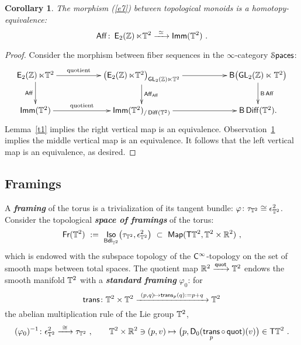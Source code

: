 \documentclass{amsart}
\newtheorem{cor}[theorem]{Corollary}
\theoremstyle{definition}
\theoremstyle{remark}
\DeclareMathOperator{\Iso}{\sf Iso}
\DeclareMathOperator{\Map}{{\sf Map}}
\newcommand{\bit}[1]{\textbf{\textit{#1}}}
\DeclareMathOperator{\Diff}{{\sf Diff}}
\DeclareMathOperator{\Spaces}{\cS\mathsf{paces}}
\newcommand{\xra}{\xrightarrow}
\def\sE{\mathsf E}\def\sF{\mathsf F}\def\sG{\mathsf G}\def\sH{\mathsf H}
\DeclareMathOperator{\GL}{\sf GL}
\DeclareMathOperator{\quot}{\sf quot}
\DeclareMathOperator{\Fr}{\sf Fr}
\DeclareMathOperator{\trans}{\sf trans}
\DeclareMathOperator{\Bdl}{\sf Bdl}
\DeclareMathOperator{\Imm}{\sf Imm}
\DeclareMathOperator{\Aff}{\sf Aff}
\DeclareMathOperator{\EZ}{\sE_2(\ZZ)}
\begin{document}
\begin{cor}
\label{t22}
The morphism (\ref{e7}) between topological monoids is a homotopy-equivalence:
\[
\Aff
\colon
\EZ \ltimes \TT^2
\xra{~\simeq~}
\Imm(\TT^2)
~.
\]

\end{cor}

\begin{proof}

Consider the morphism between fiber sequences in the $\infty$-category $\Spaces$:
\[
\xymatrix{
\EZ \ltimes \TT^2
\ar[rr]^-{\rm quotient}
\ar[d]_-{\Aff}
&&
\bigl(
\EZ \ltimes \TT^2
\bigr)_{\GL_2(\ZZ) \ltimes \TT^2}
\ar[rr]
\ar[d]^-{\Aff_{\Aff}}
&&
\sB\bigl( \GL_2(\ZZ) \ltimes \TT^2 \bigr)
\ar[d]^-{\sB \Aff}
\\
\Imm(\TT^2)
\ar[rr]^-{\rm quotient}
&&
\Imm(\TT^2)_{/\Diff(\TT^2)}
\ar[rr]
&&
\sB \Diff(\TT^2)
.
}
\]
Lemma~\ref{t1} implies the right vertical map is an equivalence.
Observation~\ref{t22} implies the middle vertical map is an equivalence.
It follows that the left vertical map is an equivalence, as desired.



\end{proof}



















\subsection{Framings}



A \bit{framing} of the torus is a trivialization of its tangent bundle: $\varphi\colon  \tau_{\mathbb T^2} \cong  \epsilon^2_{\mathbb T^2}$.
Consider the topological \bit{space of framings} of the torus:
\[
\Fr(\TT^2)
~:=~
\Iso_{\Bdl_{\TT^2}}\bigl( \tau_{\TT^2} , \epsilon^2_{\TT^2}  \bigr)
~\subset~
\Map(  \sT \TT^2  , \TT^2 \times \RR^2 )
~,
\]
which is endowed with the subspace topology of the $\mathsf C^\infty$-topology on the set of smooth maps between total spaces.  
The quotient map $\RR^2\xra{\quot}\TT^2$ endows the smooth manifold $\mathbb T^2$ with a \bit{standard framing} $\varphi_0$:
for 
\[
\trans\colon \TT^2 \times \TT^2 
\xra{~(p,q)\mapsto \trans_p(q) := p+q~} 
\TT^2
\]
the abelian multiplication rule of the Lie group $\mathbb T^2$, 
\[
(\varphi_0)^{-1}
\colon
\epsilon^2_{\TT^2}
\xra{~\cong~}
\tau_{\TT^2}
~,\qquad
\TT^2 \times \RR^2 \ni (p,v)
\mapsto
\bigl(p,\sD_{0}(\trans_p \circ \quot) (v) \bigr)
\in \sT \TT^2
~.
\]
\end{document}
